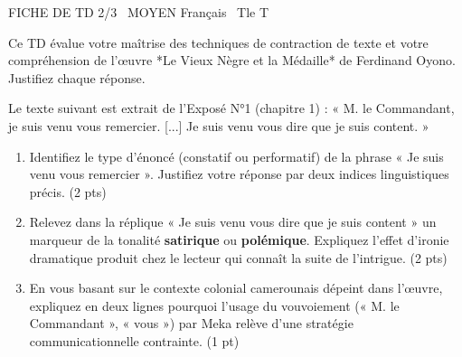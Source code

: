 \documentclass[11pt]{article}
\begin{document}
\begin{tcolorbox}[enhanced,colback=popink,colframe=popink,arc=10pt,boxrule=0pt,left=12pt,right=12pt,top=9pt,bottom=9pt]
{\color{white}\popxbold\small FICHE DE TD 2/3 \textbullet\ MOYEN \hfill Français \textbullet\ Tle T\par}
\end{tcolorbox}
\vspace{4pt}
Ce TD évalue votre maîtrise des techniques de contraction de texte et votre compréhension de l'œuvre *Le Vieux Nègre et la Médaille* de Ferdinand Oyono. Justifiez chaque réponse.

\begin{exercice}
Le texte suivant est extrait de l'Exposé N°1 (chapitre 1) : « M. le Commandant, je suis venu vous remercier. [...] Je suis venu vous dire que je suis content. » 
\begin{enumerate}
    \item Identifiez le type d'énoncé (constatif ou performatif) de la phrase « Je suis venu vous remercier ». Justifiez votre réponse par deux indices linguistiques précis. (2 pts)
    \item Relevez dans la réplique « Je suis venu vous dire que je suis content » un marqueur de la tonalité \textbf{satirique} ou \textbf{polémique}. Expliquez l'effet d'ironie dramatique produit chez le lecteur qui connaît la suite de l'intrigue. (2 pts)
    \item En vous basant sur le contexte colonial camerounais dépeint dans l'œuvre, expliquez en deux lignes pourquoi l'usage du vouvoiement (« M. le Commandant », « vous ») par Meka relève d'une stratégie communicationnelle contrainte. (1 pt)
\end{enumerate}
\end{exercice}
\end{document}
